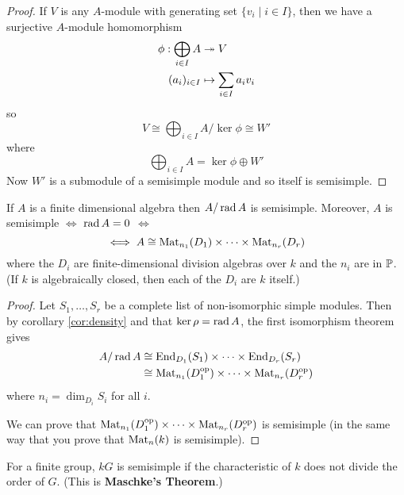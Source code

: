 \begin{proof}
	If $V$ is any $A$-module with generating set $\{v_i \mid i \in I\}$, then we have a surjective $A$-module homomorphism
    \begin{align*}
   		\phi: \bigoplus_{i \in I} A &\twoheadrightarrow V \\
        (a_i)_{i \in I} &\mapsto \sum_{i \in I} a_iv_i
    \end{align*}
    so
    \[V \cong \bigoplus_{i \in I} A/\ker\phi \cong W'\]
    where
    \[\bigoplus_{i \in I} A = \ker\phi \oplus W'\]
    Now $W'$ is a submodule of a semisimple module and so itself is semisimple.
\end{proof}

\begin{thm}
	If $A$ is a finite dimensional algebra then $A/\operatorname{rad} A$ is semisimple.
    Moreover, $A$ is semisimple $\iff$ $\operatorname{rad} A = 0$ $\iff$
    \[\iff A \cong \operatorname{Mat}_{n_1}(D_1) \times \cdots \times \operatorname{Mat}_{n_r}(D_r)\]
    where the $D_i$ are finite-dimensional division algebras over $k$ and the $n_i$ are in $\mathbb{P}$.
    (If $k$ is algebraically closed, then each of the $D_i$ are $k$ itself.)
\end{thm}

\begin{proof}
	Let $S_1,\ldots,S_r$ be a complete list of non-isomorphic simple modules.
    Then by corollary \ref{cor:density} and that $\ker\rho = \operatorname{rad} A$, the first isomorphism theorem gives
    \begin{align*}
    	A/\operatorname{rad} A &\cong \operatorname{End}_{D_1}(S_1) \times \cdots \times \operatorname{End}_{D_r}(S_r) \\
        &\cong \operatorname{Mat}_{n_1}(D_1^{\operatorname{op}}) \times \cdots \times \operatorname{Mat}_{n_r}(D_r^{\operatorname{op}})
    \end{align*}
    where $n_i = \dim_{D_i} S_i$ for all $i$.

	We can prove that $\operatorname{Mat}_{n_1}(D_1^{\operatorname{op}}) \times \cdots \times \operatorname{Mat}_{n_r}(D_r^{\operatorname{op}})$ is semisimple (in the same way that you prove that $\operatorname{Mat}_n(k)$ is semisimple).
\end{proof}

\begin{rmk}
	For a finite group, $kG$ is semisimple if the characteristic of $k$ does not divide the order of $G$.
    (This is \textbf{Maschke's Theorem}.)
\end{rmk}
